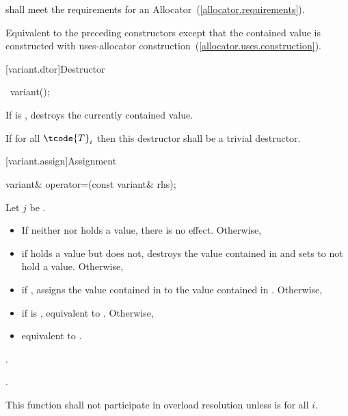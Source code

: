 \begin{itemdescr}
\pnum
\requires
{} shall meet the requirements for an Allocator~(\ref{allocator.requirements}).

\pnum
\effects
Equivalent to the preceding constructors except that the contained value is
constructed with uses-allocator construction~(\ref{allocator.uses.construction}).
\end{itemdescr}

[variant.dtor]{Destructor}

%
\begin{itemdecl}
~variant();
\end{itemdecl}

\begin{itemdescr}
\pnum
\effects
If  is ,
destroys the currently contained value.

\pnum
\remarks
If  for all $\tcode{T}_i$
then this destructor shall be a trivial destructor.
\end{itemdescr}

[variant.assign]{Assignment}

%
\begin{itemdecl}
variant& operator=(const variant& rhs);
\end{itemdecl}

\begin{itemdescr}
\pnum
Let $j$ be .

\pnum
\effects
\begin{itemize}
\item
If neither  nor  holds a value, there is no effect.  Otherwise,
\item
if  holds a value but  does not, destroys the value
contained in  and sets  to not hold a value.  Otherwise,
\item
if , assigns the value contained in 
to the value contained in . Otherwise,
\item
if 
 is ,
equivalent to . Otherwise,
\item
equivalent to .
\end{itemize}

\pnum
\returns {}.

\pnum
\postconditions {}.

\pnum
\remarks
This function shall not participate in overload resolution unless
is  for all $i$.
\end{itemdescr}

